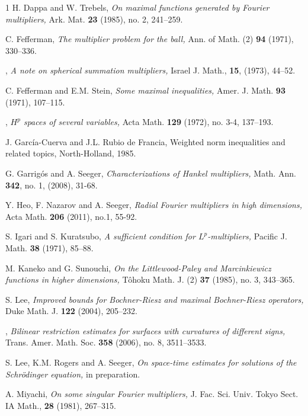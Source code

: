 \documentclass[11pt]{amsart}
\theoremstyle{definition}
\numberwithin{theorem}{section}
\numberwithin{definition}{section}
\newcommand{\note}[1]{\footnote{\texttt{\Small #1}}}
\def\emph#1{{\it #1 }}
\begin{document}
\begin{thebibliography}{1}
 H. Dappa and W. Trebels,
\emph{On maximal functions generated by Fourier multipliers,}  Ark. Mat. {\bf 23}  (1985),  no. 2, 241--259.

 C. Fefferman, \emph{The multiplier problem for the ball,}  Ann. of Math. (2)  {\bf 94}  (1971), 330--336.

 \bysame,
 \emph{A note on spherical summation
multipliers,} Israel J. Math., {\bf 15}, (1973), 44--52.

 C. Fefferman and E.M. Stein, \emph{Some maximal inequalities,} Amer. J. Math. {\bf 93} (1971), 107--115.

 \bysame,  \emph{$H^p$ spaces of several variables,}
Acta Math.  {\bf 129}  (1972), no. 3-4, 137--193.

 J. Garc\'ia-Cuerva and J.L. Rubio de Francia,
Weighted norm inequalities and related topics,
North-Holland, 1985.

 G. Garrig\'os and A. Seeger,
\emph{Characterizations of Hankel multipliers,}
Math. Ann. {\bf 342}, no. 1,  (2008), 31-68.


 Y. Heo, F. Nazarov and A. Seeger, \emph{Radial Fourier
  multipliers in high dimensions,} Acta Math. {\bf 206}  (2011), no.1, 55-92.


 S. Igari and S. Kuratsubo, \emph{A sufficient condition for $L^{p}$-multipliers,}
Pacific J. Math. {\bf 38} (1971), 85--88.

 M. Kaneko and  G. Sunouchi,
\emph{On the Littlewood-Paley and Marcinkiewicz functions in higher dimensions,}  T\^ohoku Math. J. (2)  {\bf 37}  (1985),  no. 3, 343--365.


 S. Lee, \emph{Improved bounds
for Bochner-Riesz and maximal Bochner-Riesz operators,} Duke Math.
J.  {\bf 122}  (2004), 205--232.

 \bysame , \emph{Bilinear restriction estimates for surfaces with curvatures of different signs,}
Trans. Amer. Math. Soc. {\bf 358} (2006), no. 8, 3511--3533.




 S. Lee, K.M. Rogers and A. Seeger,
\emph{On space-time estimates for solutions  of  the Schr\"odinger equation,}
in preparation.





  A. Miyachi, \emph{On some singular Fourier multipliers,}
{J. Fac. Sci. Univ. Tokyo Sect. IA Math.,} {\bf 28} (1981), {267--315}.


\end{thebibliography}
\end{document}
